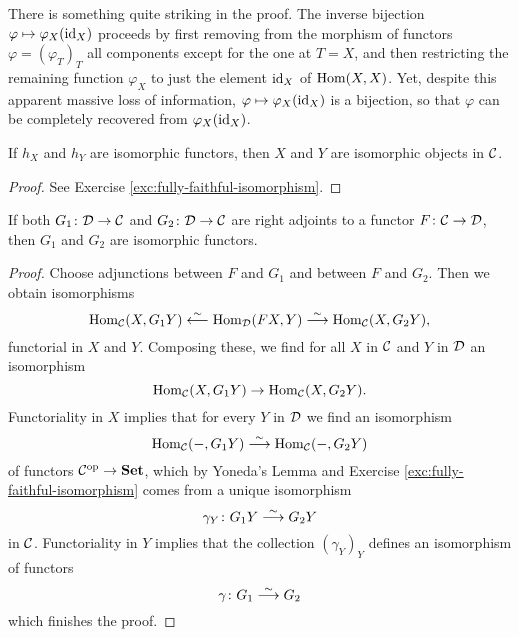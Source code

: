 \begin{remark}
There is something quite striking in the proof. The inverse bijection $\varphi \mapsto \varphi_X({\rm id}_X)$ proceeds by first 
removing from the morphism of functors $\varphi=(\varphi_T)_T$ all components except for the one at $T=X$, and then restricting the remaining function
$\varphi_X$ to just the element ${\rm id}_X$ of $\operatorname{Hom}(X,X)$. Yet, despite this apparent massive loss of information, $\varphi \mapsto \varphi_X({\rm id}_X)$ is a bijection, so that $\varphi$ can be completely recovered from $\varphi_X({\rm id}_X)$.
\end{remark}


\begin{corollary}\label{cor:yoneda-iso}
If $h_X$ and $h_Y$ are isomorphic functors, then $X$ and $Y$ are isomorphic objects in ${\mathcal{C}}$. 
\end{corollary}

\begin{proof}
See Exercise \ref{exc:fully-faithful-isomorphism}.
\end{proof}


\begin{corollary}
If both $G_1\colon {\mathcal{D}} \to {\mathcal{C}}$ and $G_2\colon {\mathcal{D}} \to {\mathcal{C}}$ are right adjoints to a functor $F\colon {\mathcal{C}} \to {\mathcal{D}}$, then $G_1$ and $G_2$ are isomorphic functors.
\end{corollary}

\begin{proof}
Choose adjunctions between $F$ and $G_1$ and between $F$ and $G_2$. Then we obtain isomorphisms
\[
	 \operatorname{Hom}_{\mathcal{C}}( X, G_1Y ) \overset{\sim}{\longleftarrow} \operatorname{Hom}_{\mathcal{D}}( FX, Y ) \overset{\sim}{\longrightarrow} \operatorname{Hom}_{\mathcal{C}}( X, G_2Y ),
\]
functorial in $X$ and $Y$. Composing these, we find for all $X$ in ${\mathcal{C}}$ and $Y$ in ${\mathcal{D}}$ an isomorphism
\[
	 \operatorname{Hom}_{\mathcal{C}}( X, G_1Y ) \to \operatorname{Hom}_{\mathcal{C}}( X, G_2Y ).
\]
Functoriality in $X$ implies that for every $Y$ in ${\mathcal{D}}$ we find an isomorphism 
\[
	 \operatorname{Hom}_{\mathcal{C}}( -, G_1Y) \overset{\sim}{\longrightarrow} \operatorname{Hom}_{\mathcal{C}}( -, G_2Y )
\]
of functors ${\mathcal{C}}^{\mathrm{op}} \to \mathbf{Set}$, which by Yoneda's Lemma and Exercise \ref{exc:fully-faithful-isomorphism} 
comes from a unique isomorphism
\[
	\gamma_{Y} \colon G_1Y \overset{\sim}{\longrightarrow} G_2Y
\]
in ${\mathcal{C}}$. Functoriality in $Y$ implies that the collection $(\gamma_Y)_Y$ defines an isomorphism of functors
\[
	\gamma\colon G_1\overset{\sim}{\longrightarrow} G_2
\]
which finishes the proof.
\end{proof}

